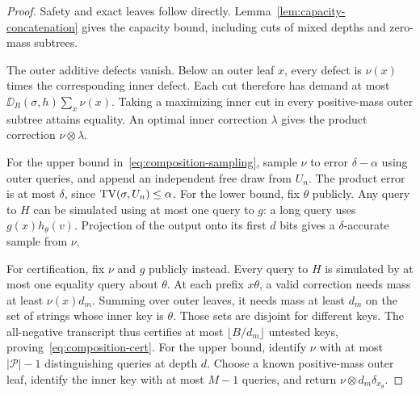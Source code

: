 \begin{proof}
Safety and exact leaves follow directly. Lemma~\ref{lem:capacity-concatenation} gives the capacity bound, including cuts of mixed depths and zero-mass subtrees.

The outer additive defects vanish. Below an outer leaf $x$, every defect is $\nu(x)$ times the corresponding inner defect. Each cut therefore has demand at most $\DD_R(\sigma,h)\sum_x\nu(x)$. Taking a maximizing inner cut in every positive-mass outer subtree attains equality. An optimal inner correction $\lambda$ gives the product correction $\nu\otimes\lambda$.

For the upper bound in~\eqref{eq:composition-sampling}, sample $\nu$ to error $\delta-\alpha$ using outer queries, and append an independent free draw from $U_n$. The product error is at most $\delta$, since $\operatorname{TV}(\sigma,U_n)\le\alpha$. For the lower bound, fix $\theta$ publicly. Any query to $H$ can be simulated using at most one query to $g$: a long query uses $g(x)h_\theta(v)$. Projection of the output onto its first $d$ bits gives a $\delta$-accurate sample from $\nu$.

For certification, fix $\nu$ and $g$ publicly instead. Every query to $H$ is simulated by at most one equality query about $\theta$. At each prefix $x\theta$, a valid correction needs mass at least $\nu(x)d_m$. Summing over outer leaves, it needs mass at least $d_m$ on the set of strings whose inner key is $\theta$. Those sets are disjoint for different keys. The all-negative transcript thus certifies at most $\lfloor B/d_m\rfloor$ untested keys, proving~\eqref{eq:composition-cert}. For the upper bound, identify $\nu$ with at most $|\mathcal P|-1$ distinguishing queries at depth $d$. Choose a known positive-mass outer leaf, identify the inner key with at most $M-1$ queries, and return $\nu\otimes d_m\delta_{x_\theta}$.
\end{proof}

